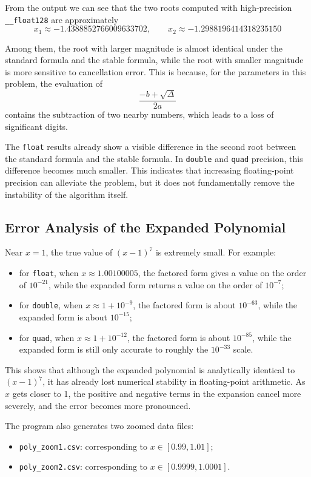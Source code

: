 \documentclass[12pt,a4paper]{article}
\begin{document}
From the output we can see that the two roots computed with high-precision \texttt{\_\_float128} are approximately
\[
x_1\approx -1.4388852766009633702,
\qquad
x_2\approx -1.2988196414318235150
\]

Among them, the root with larger magnitude is almost identical under the standard formula and the stable formula, while the root with smaller magnitude is more sensitive to cancellation error. This is because, for the parameters in this problem, the evaluation of
\[
\frac{-b+\sqrt{\Delta}}{2a}
\]
contains the subtraction of two nearby numbers, which leads to a loss of significant digits.

The \texttt{float} results already show a visible difference in the second root between the standard formula and the stable formula. In \texttt{double} and \texttt{quad} precision, this difference becomes much smaller. This indicates that increasing floating-point precision can alleviate the problem, but it does not fundamentally remove the instability of the algorithm itself.

\subsection*{Error Analysis of the Expanded Polynomial}

Near $x=1$, the true value of $(x-1)^7$ is extremely small. For example:
\begin{itemize}
    \item for \texttt{float}, when $x\approx 1.00100005$, the factored form gives a value on the order of $10^{-21}$, while the expanded form returns a value on the order of $10^{-7}$;
    \item for \texttt{double}, when $x\approx 1+10^{-9}$, the factored form is about $10^{-63}$, while the expanded form is about $10^{-15}$;
    \item for \texttt{quad}, when $x\approx 1+10^{-12}$, the factored form is about $10^{-85}$, while the expanded form is still only accurate to roughly the $10^{-33}$ scale.
\end{itemize}

This shows that although the expanded polynomial is analytically identical to $(x-1)^7$, it has already lost numerical stability in floating-point arithmetic. As $x$ gets closer to 1, the positive and negative terms in the expansion cancel more severely, and the error becomes more pronounced.

The program also generates two zoomed data files:
\begin{itemize}
    \item \texttt{poly\_zoom1.csv}: corresponding to $x\in[0.99,1.01]$;
    \item \texttt{poly\_zoom2.csv}: corresponding to $x\in[0.9999,1.0001]$.
\end{itemize}
\end{document}
